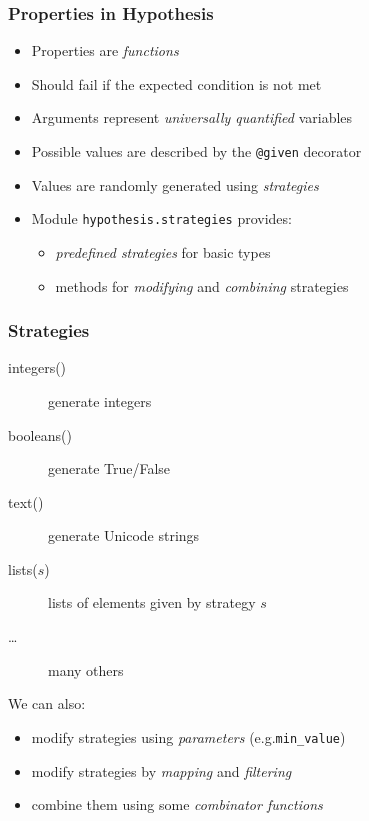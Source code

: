 \documentclass{beamer}
\begin{document}
\begin{frame}
  \frametitle{Properties in Hypothesis}

  \begin{itemize}
  \item Properties are \emph{functions}
  \item Should fail if the expected condition is not met
  \item Arguments represent \emph{universally quantified}
    variables
  \item Possible values are described
    by the \texttt{@given} decorator
  \item Values are randomly generated using \emph{strategies}
  \item Module \texttt{hypothesis.strategies} provides:
    \begin{itemize}
    \item \emph{predefined strategies} for basic types
    \item methods for \emph{modifying} and \emph{combining} strategies
    \end{itemize}
  \end{itemize}
\end{frame}

\begin{frame}
  \frametitle{Strategies}

  \begin{description}
  \item[integers()] generate integers
  \item[booleans()] generate True/False
  \item[text()] generate Unicode strings
  \item[lists($s$)] lists of elements given by strategy $s$
    \item[\ldots] many others
  \end{description}
  \bigskip
  
  We can also:
  \begin{itemize}
  \item modify strategies using \emph{parameters} (e.g.\@ \texttt{min\_value})
  \item modify strategies by \emph{mapping} and \emph{filtering}
  \item combine them using some \emph{combinator functions}
  \end{itemize} 
\end{frame}
\end{document}
